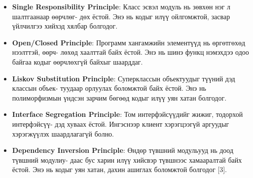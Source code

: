 \begin{itemize}
	\item \textbf{Single Responsibility Principle}: Класс эсвэл модуль нь зөвхөн нэг л шалтгаанаар өөрчлөг- дөх ёстой. Энэ нь кодыг илүү ойлгомжтой, засвар үйлчилгээ хийхэд хялбар болгодог.
	\item \textbf{Open/Closed Principle}: Программ хангамжийн элементүүд нь өргөтгөхөд нээлттэй, өөрч- лөхөд хаалттай байх ёстой. Энэ нь шинэ функц нэмэхдээ одоо байгаа кодыг өөрчлөхгүй байхыг шаарддаг.
	\item \textbf{Liskov Substitution Principle}: Суперклассын объектуудыг түүний дэд классын объек- туудаар орлуулах боломжтой байх ёстой. Энэ нь полиморфизмын үндсэн зарчим бөгөөд кодыг илүү уян хатан болгодог.
	\item \textbf{Interface Segregation Principle}: Том интерфэйсүүдийг жижиг, тодорхой интерфэйсүү- дэд хуваах ёстой. Ингэснээр клиент хэрэгцээгүй аргуудыг хэрэгжүүлэх шаардлагагүй болно.
	\item \textbf{Dependency Inversion Principle}: Өндөр түвшний модульууд нь доод түвшний модулиу- даас бус харин илүү хийсвэр түвшнээс хамааралтай байх ёстой. Энэ нь кодыг уян хатан, дахин ашиглах боломжтой болгодог [3].
\end{itemize}
